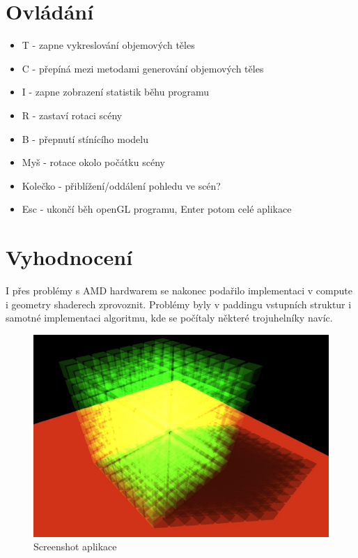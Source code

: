 \documentclass[a4paper, 12pt]{article}
\begin{document}

\section{Ovládání}

\begin{itemize}
	\item T - zapne vykreslování objemových těles
	\item C - přepíná mezi metodami generování objemových těles
	\item I - zapne zobrazení statistik běhu programu
	\item R - zastaví rotaci scény
	\item B - přepnutí stínícího modelu
	\item Myš - rotace okolo počátku scény
	\item Kolečko - přiblížení/oddálení pohledu ve scén?
	\item Esc - ukončí běh openGL programu, Enter potom celé aplikace
\end{itemize}


\section{Vyhodnocení}

I přes problémy s AMD hardwarem se nakonec podařilo implementaci v compute i geometry shaderech zprovoznit.
Problémy byly v paddingu vstupních struktur i samotné implementaci algoritmu, kde se počítaly
některé trojuhelníky navíc. 

\begin{figure}[H]
	\centering
	\includegraphics[width=12cm,keepaspectratio]{screenshot}
	\caption{Screenshot aplikace}
	\label{fig:screenshot}
\end{figure}
\end{document}
